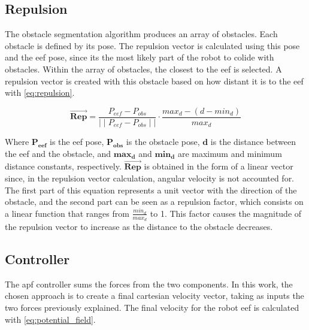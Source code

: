 \subsection{Repulsion}
\label{ssec:repulsion}

\par The obstacle segmentation algorithm produces an array of obstacles. Each obstacle is defined by its pose. The repulsion vector is calculated using this pose and the \ac{eef} pose, since its the most likely part of the robot to colide with obstacles. Within the array of obstacles, the closest to the \ac{eef} is selected. A repulsion vector is created with this obstacle based on how distant it is to the \ac{eef} with \autoref{eq:repulsion}.

\begin{equation}
    \vec{\mathbf{Rep}} = \frac{P_{eef}-P_{obs}}{\mid\mid P_{eef}-P_{obs} \mid\mid}\cdot\frac{max_d-(d-min_d)}{max_d} 
    \label{eq:repulsion}
\end{equation}

\noindent Where $\mathbf{P_{eef}}$ is the \ac{eef} pose, $\mathbf{P_{obs}}$ is the obstacle pose, $\mathbf{d}$ is the distance between the \ac{eef} and the obstacle, and $\mathbf{max_d}$ and $\mathbf{min_d}$ are maximum and minimum distance constants, respectively. $\vec{\mathbf{Rep}}$ is obtained in the form of a linear vector since, in the repulsion vector calculation, angular velocity is not accounted for. The first part of this equation represents a unit vector with the direction of the obstacle, and the second part can be seen as a repulsion factor, which consists on a linear function that ranges from $\frac{min_d}{max_d}$ to 1. This factor causes the magnitude of the repulsion vector to increase as the distance to the obstacle decreases.



\subsection{Controller}

\par The \ac{apf} controller sums the forces from the two components. In this work, the chosen approach is to create a final cartesian velocity vector, taking as inputs the two forces previously explained. The final velocity for the robot \ac{eef} is calculated with \autoref{eq:potential_field}.


